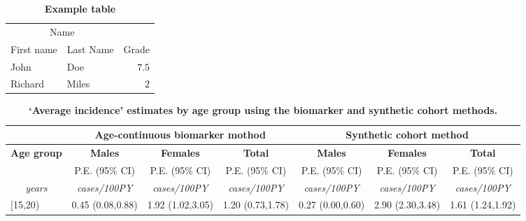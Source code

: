 \documentclass[a4paper,10pt]{article} %
\begin{document}
\begin{table}
\caption{{\bf Example table}}
\centering
\begin{tabular}{llr}
\toprule
\multicolumn{2}{c}{Name} \\
\cmidrule(r){1-2}
First name & Last Name & Grade \\
\midrule
John & Doe & $7.5$ \\
Richard & Miles & $2$ \\
\bottomrule
\end{tabular}
\end{table}

\begin{table}[!ht]
\begin{adjustwidth}{-20mm}{0mm} %
\begin{flushleft}\caption{
{\bf ‘Average incidence’ estimates by age group using the biomarker and synthetic cohort methods.}}\end{flushleft}
\centering
\begin{tabular}{|l|c|c|c|c|c|c|}
\hline
                                      & \multicolumn{3}{|c|}{\bf Age-continuous biomarker mothod} & \multicolumn{3}{|c|}{\bf Synthetic cohort method}    \\ \hline
\multicolumn{1}{|c|}{\bf Age group}   & {\bf Males}         & {\bf Females}       & {\bf Total}         & {\bf Males}         & {\bf Females}       & {\bf Total} \\
                                      & P.E. (95\% CI)      & P.E. (95\% CI)      & P.E. (95\% CI)      & P.E. (95\% CI)      & P.E. (95\% CI)      & P.E. (95\% CI) \\
\multicolumn{1}{|c|}{\emph{years}}    & \emph{cases/100PY}  & \emph{cases/100PY}  & \emph{cases/100PY}  & \emph{cases/100PY}  & \emph{cases/100PY}  & \emph{cases/100PY} \\ \hline %
[15,20)                               & 0.45 (0.08,0.88)    & 1.92 (1.02,3.05)    & 1.20 (0.73,1.78)    & 0.27 (0.00,0.60)    & 2.90 (2.30,3.48)    & 1.61 (1.24,1.92) \\ \hline

\end{tabular}
\end{adjustwidth}
\end{table}
\end{document}

